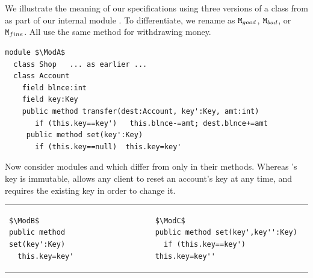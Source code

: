 
\begin{example}
We illustrate the meaning of our specifications  using three  versions of a class   from  \cite{OOPSLA22} 
as part of our internal module \Mshop. 
To differentiate, we rename \Mshop  as $\mbox{\normalfont{\texttt{M}}}_{{good}}$,  $\mbox{\normalfont{\texttt{M}}}_{{bad}}$, or $\mbox{\normalfont{\texttt{M}}}_{{fine}}$. 
All use the same  method for withdrawing money.
\begin{lstlisting}[mathescape=true, language=Chainmail, frame=lines]
module $\ModA$      
  class Shop   ... as earlier ...
  class Account
    field blnce:int 
    field key:Key
    public method transfer(dest:Account, key':Key, amt:int)
       if (this.key==key')   this.blnce-=amt; dest.blnce+=amt
     public method set(key':Key)
       if (this.key==null)  this.key=key'
\end{lstlisting}

Now consider  modules \ModB and \ModC which differ from \ModA only in their  methods. Whereas \ModA 's key is immutable, \ModB allows any client to reset an account's key at any time, and \ModC requires the existing key in order to change it.
  

\begin{tabular}{lll}
\begin{minipage}[b]{0.40\textwidth}

\begin{lstlisting}[mathescape=true, language=Chainmail, frame=lines]
$\ModB$
public method set(key':Key)
  this.key=key'
\end{lstlisting}
\end{minipage}
&\ \ \  \ \   &%
\begin{minipage}[b]{0.48\textwidth}
\begin{lstlisting}[mathescape=true, language=chainmail, frame=lines]
$\ModC$
public method set(key',key'':Key)
  if (this.key==key')  this.key=key''
\end{lstlisting}
\end{minipage} 
\end{tabular}


\end{example}
